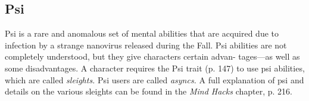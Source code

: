 \subsection{Psi}

Psi is a rare and anomalous set of mental abilities that 
are acquired due to infection by a strange nanovirus 
released during the Fall. Psi abilities are not completely 
understood, but they give characters certain advan-
tages—as well as some disadvantages. A character 
requires the Psi trait (p. 147) to use psi abilities, which 
are called \textit{sleights.} Psi users are called \textit{asyncs.} A full 
explanation of psi and details on the various sleights 
can be found in the \textit{Mind Hacks }chapter, p. 216.

